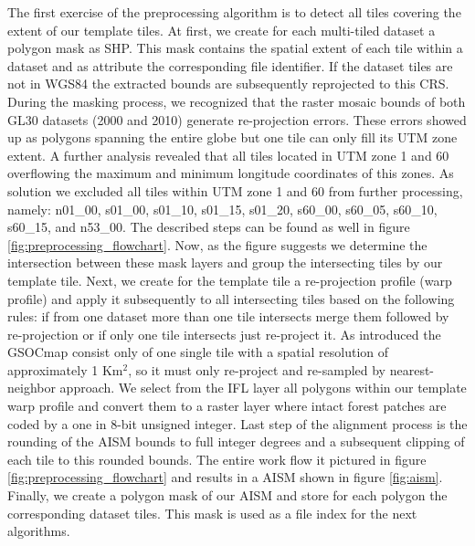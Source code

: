 		The first exercise of the preprocessing algorithm is to detect all tiles covering the extent of our template tiles. At first, we create for each multi-tiled dataset a polygon mask as \ac{SHP}. This mask contains the spatial extent of each tile within a dataset and as attribute the corresponding file identifier. If the dataset tiles are not in \ac{WGS84} the extracted bounds are subsequently reprojected to this \ac{CRS}. During the masking process, we recognized that the raster mosaic bounds of both \ac{GL30} datasets (2000 and 2010) generate re-projection errors. These errors showed up as polygons spanning the entire globe but one tile can only fill its \ac{UTM} zone extent. A further analysis revealed that all tiles located in \ac{UTM} zone 1 and 60 overflowing the maximum and minimum longitude coordinates of this zones. As solution we excluded all tiles within \ac{UTM} zone 1 and 60 from further processing, namely: n01\_00, s01\_00, s01\_10, s01\_15, s01\_20, s60\_00, s60\_05, s60\_10, s60\_15, and n53\_00. The described steps can be found as well in figure \ref{fig:preprocessing_flowchart}. Now, as the figure suggests we determine the intersection between these mask layers and group the intersecting tiles by our template tile. Next, we create for the template tile a re-projection profile (warp profile) and apply it subsequently to all intersecting tiles based on the following rules: if from one dataset more than one tile intersects merge them followed by re-projection or if only one tile intersects just re-project it. As introduced the \ac{GSOCmap} consist only of one single tile with a spatial resolution of approximately 1 Km$^2$, so it must only re-project and re-sampled by nearest-neighbor approach. We select from the \ac{IFL} layer all polygons within our template warp profile and convert them to a raster layer where intact forest patches are coded by a one in 8-bit unsigned integer. Last step of the alignment process is the rounding of the \ac{AISM} bounds to full integer degrees and a subsequent clipping of each tile to this rounded bounds. The entire work flow it pictured in figure \ref{fig:preprocessing_flowchart} and results in a \ac{AISM} shown in figure \ref{fig:aism}. Finally, we create a polygon mask of our \ac{AISM} and store for each polygon the corresponding dataset tiles. This mask is used as a file index for the next algorithms.
